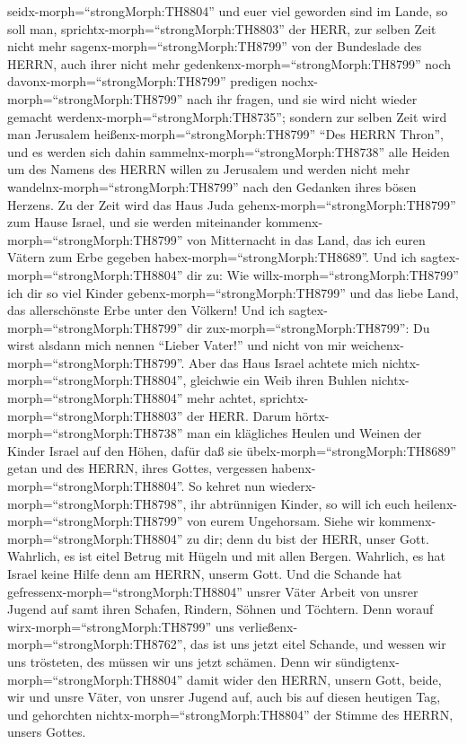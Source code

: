seidx-morph=``strongMorph:TH8804'' und euer viel geworden sind im Lande,
so soll man, sprichtx-morph=``strongMorph:TH8803'' der HERR, zur selben
Zeit nicht mehr sagenx-morph=``strongMorph:TH8799'' von der Bundeslade
des HERRN, auch ihrer nicht mehr gedenkenx-morph=``strongMorph:TH8799''
noch davonx-morph=``strongMorph:TH8799'' predigen
nochx-morph=``strongMorph:TH8799'' nach ihr fragen, und sie wird nicht
wieder gemacht werdenx-morph=``strongMorph:TH8735''; 
sondern zur selben Zeit wird man Jerusalem
heißenx-morph=``strongMorph:TH8799'' ``Des HERRN Thron'', und es werden
sich dahin sammelnx-morph=``strongMorph:TH8738'' alle Heiden um des
Namens des HERRN willen zu Jerusalem und werden nicht mehr
wandelnx-morph=``strongMorph:TH8799'' nach den Gedanken ihres bösen
Herzens.  Zu der Zeit wird das Haus Juda
gehenx-morph=``strongMorph:TH8799'' zum Hause Israel, und sie werden
miteinander kommenx-morph=``strongMorph:TH8799'' von Mitternacht in das
Land, das ich euren Vätern zum Erbe gegeben
habex-morph=``strongMorph:TH8689''.  Und ich
sagtex-morph=``strongMorph:TH8804'' dir zu: Wie
willx-morph=``strongMorph:TH8799'' ich dir so viel Kinder
gebenx-morph=``strongMorph:TH8799'' und das liebe Land, das
allerschönste Erbe unter den Völkern! Und ich
sagtex-morph=``strongMorph:TH8799'' dir
zux-morph=``strongMorph:TH8799'': Du wirst alsdann mich nennen ``Lieber
Vater!'' und nicht von mir weichenx-morph=``strongMorph:TH8799''.
 Aber das Haus Israel achtete mich
nichtx-morph=``strongMorph:TH8804'', gleichwie ein Weib ihren Buhlen
nichtx-morph=``strongMorph:TH8804'' mehr achtet,
sprichtx-morph=``strongMorph:TH8803'' der HERR.  Darum
hörtx-morph=``strongMorph:TH8738'' man ein klägliches Heulen und Weinen
der Kinder Israel auf den Höhen, dafür daß sie
übelx-morph=``strongMorph:TH8689'' getan und des HERRN, ihres Gottes,
vergessen habenx-morph=``strongMorph:TH8804''.  So kehret
nun wiederx-morph=``strongMorph:TH8798'', ihr abtrünnigen Kinder, so
will ich euch heilenx-morph=``strongMorph:TH8799'' von eurem Ungehorsam.
Siehe wir kommenx-morph=``strongMorph:TH8804'' zu dir; denn du bist der
HERR, unser Gott.  Wahrlich, es ist eitel Betrug mit Hügeln
und mit allen Bergen. Wahrlich, es hat Israel keine Hilfe denn am HERRN,
unserm Gott.  Und die Schande hat
gefressenx-morph=``strongMorph:TH8804'' unsrer Väter Arbeit von unsrer
Jugend auf samt ihren Schafen, Rindern, Söhnen und Töchtern.
 Denn worauf wirx-morph=``strongMorph:TH8799'' uns
verließenx-morph=``strongMorph:TH8762'', das ist uns jetzt eitel
Schande, und wessen wir uns trösteten, des müssen wir uns jetzt schämen.
Denn wir sündigtenx-morph=``strongMorph:TH8804'' damit wider den HERRN,
unsern Gott, beide, wir und unsre Väter, von unsrer Jugend auf, auch bis
auf diesen heutigen Tag, und gehorchten
nichtx-morph=``strongMorph:TH8804'' der Stimme des HERRN, unsers Gottes.

